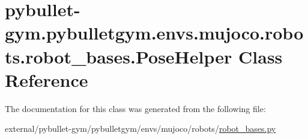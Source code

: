 \hypertarget{classpybullet-gym_1_1pybulletgym_1_1envs_1_1mujoco_1_1robots_1_1robot__bases_1_1_pose_helper}{}\section{pybullet-\/gym.pybulletgym.\+envs.\+mujoco.\+robots.\+robot\+\_\+bases.\+Pose\+Helper Class Reference}
\label{classpybullet-gym_1_1pybulletgym_1_1envs_1_1mujoco_1_1robots_1_1robot__bases_1_1_pose_helper}


The documentation for this class was generated from the following file\+:\begin{DoxyCompactItemize}
\item 
external/pybullet-\/gym/pybulletgym/envs/mujoco/robots/\hyperlink{mujoco_2robots_2robot__bases_8py}{robot\+\_\+bases.\+py}\end{DoxyCompactItemize}
